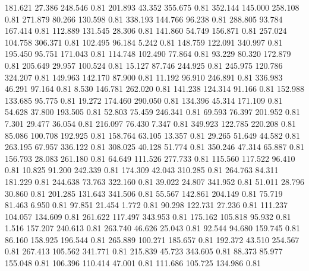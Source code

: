  181.621   27.386  248.546         0.81
 201.893   43.352  355.675         0.81
 352.144  145.000  258.108         0.81
 271.879   80.266  130.598         0.81
 338.193  144.766   96.238         0.81
 288.805   93.784  167.414         0.81
 112.889  131.545   28.306         0.81
 141.860   54.749  156.871         0.81
 257.024  104.758  306.371         0.81
 102.495   96.184    5.242         0.81
 148.759  122.091  340.997         0.81
 195.450   95.751  171.043         0.81
 114.748  102.490   77.864         0.81
  93.229   80.320  172.879         0.81
 205.649   29.957  100.524         0.81
  15.127   87.746  244.925         0.81
 245.975  120.786  324.207         0.81
 149.963  142.170   87.900         0.81
  11.192   96.910  246.891         0.81
 336.983   46.291   97.164         0.81
   8.530  146.781  262.020         0.81
 141.238  124.314   91.166         0.81
 152.988  133.685   95.775         0.81
  19.272  174.460  290.050         0.81
 134.396   45.314  171.109         0.81
  54.628   37.800  193.505         0.81
  52.803   75.459  246.341         0.81
  69.593   76.397  201.952         0.81
   7.301   29.477   36.054         0.81
 216.097   76.430    7.347         0.81
 349.923  122.785  220.208         0.81
  85.086  100.708  192.925         0.81
 158.764   63.105   13.357         0.81
  29.265   51.649   44.582         0.81
 263.195   67.957  336.122         0.81
 308.025   40.128   51.774         0.81
 350.246   47.314   65.887         0.81
 156.793   28.083  261.180         0.81
  64.649  111.526  277.733         0.81
 115.560  117.522   96.410         0.81
  10.825   91.200  242.339         0.81
 174.309   42.043  310.285         0.81
 264.763   84.311  181.229         0.81
 244.638   73.763  322.160         0.81
  39.022   24.807  341.952         0.81
  51.011   28.796   30.860         0.81
 201.285  131.643  341.506         0.81
  55.567  142.861  204.149         0.81
  75.719   81.463    6.950         0.81
  97.851   21.454    1.772         0.81
  90.298  122.731   27.236         0.81
 111.237  104.057  134.609         0.81
 261.622  117.497  343.953         0.81
 175.162  105.818   95.932         0.81
   1.516  157.207  240.613         0.81
 263.740   46.626   25.043         0.81
  92.544   94.680  159.745         0.81
  86.160  158.925  196.544         0.81
 265.889  100.271  185.657         0.81
 192.372   43.510  254.567         0.81
 267.413  105.562  341.771         0.81
 215.839   45.723  343.605         0.81
  88.373   85.977  155.048         0.81
 106.396  110.414   47.001         0.81
 111.686  105.725  134.986         0.81
